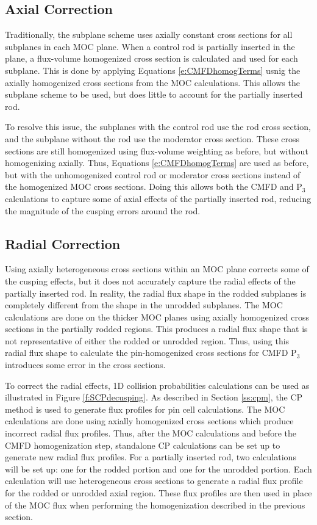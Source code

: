 \subsection{Axial Correction}

Traditionally, the subplane scheme uses axially constant cross sections for all subplanes in each MOC plane.  When a control rod is partially inserted in the plane, a flux-volume homogenized cross section is calculated and used for each subplane.  This is done by applying Equations \ref{e:CMFDhomogTerms} usnig the axially homogenized cross sections from the MOC calculations.  This allows the subplane scheme to be used, but does little to account for the partially inserted rod.

To resolve this issue, the subplanes with the control rod use the rod cross section, and the subplane without the rod use the moderator cross section.  These cross sections are still homogenized using flux-volume weighting as before, but without homogenizing axially.  Thus, Equations \ref{e:CMFDhomogTerms} are used as before, but with the unhomogenized control rod or moderator cross sections instead of the homogenized MOC cross sections.  Doing this allows both the CMFD and P$_3$ calculations to capture some of axial effects of the partially inserted rod, reducing the magnitude of the cusping errors around the rod.

\subsection{Radial Correction}

Using axially heterogeneous cross sections within an MOC plane corrects some of the cusping effects, but it does not accurately capture the radial effects of the partially inserted rod.  In reality, the radial flux shape in the rodded subplanes is completely different from the shape in the unrodded subplanes.  The MOC calculations are done on the thicker MOC planes using axially homogenized cross sections in the partially rodded regions.  This produces a radial flux shape that is not representative of either the rodded or unrodded region.  Thus, using this radial flux shape to calculate the pin-homogenized cross sections for CMFD P$_3$ introduces some error in the cross sections.

To correct the radial effects, 1D collision probabilities calculations can be used as illustrated in Figure \ref{f:SCPdecusping}.  As described in Section \ref{ss:cpm}, the CP method is used to generate flux profiles for pin cell calculations.  The MOC calculations are done using axially homogenized cross sections which produce incorrect radial flux profiles.  Thus, after the MOC calculations and before the CMFD homogenization step, standalone CP calculations can be set up to generate new radial flux profiles.  For a partially inserted rod, two calculations will be set up: one for the rodded portion and one for the unrodded portion.  Each calculation will use heterogeneous cross sections to generate a radial flux profile for the rodded or unrodded axial region.  These flux profiles are then used in place of the MOC flux when performing the homogenization described in the previous section.


